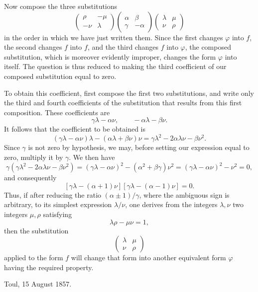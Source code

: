 \documentclass[11pt]{article}
\begin{document}
Now compose the three substitutions
\[
\begin{pmatrix}\rho&-\mu\\ -\nu&\lambda\end{pmatrix}
\begin{pmatrix}\alpha&\beta\\ \gamma&-\alpha\end{pmatrix}
\begin{pmatrix}\lambda&\mu\\ \nu&\rho\end{pmatrix}
\]
in the order in which we have just written them. Since the first changes \(\varphi\) into \(f\), the second changes \(f\) into \(f\), and the third changes \(f\) into \(\varphi\), the composed substitution, which is moreover evidently improper, changes the form \(\varphi\) into itself. The question is thus reduced to making the third coefficient of our composed substitution equal to zero.

To obtain this coefficient, first compose the first two substitutions, and write only the third and fourth coefficients of the substitution that results from this first composition. These coefficients are
\[
\gamma\lambda-\alpha\nu,\qquad -\alpha\lambda-\beta\nu.
\]
It follows that the coefficient to be obtained is
\[
(\gamma\lambda-\alpha\nu)\lambda-(\alpha\lambda+\beta\nu)\nu
=\gamma\lambda^2-2\alpha\lambda\nu-\beta\nu^2.
\]
Since \(\gamma\) is not zero by hypothesis, we may, before setting our expression equal to zero, multiply it by \(\gamma\). We then have
\[
\gamma(\gamma\lambda^2-2\alpha\lambda\nu-\beta\nu^2)
=(\gamma\lambda-\alpha\nu)^2-(\alpha^2+\beta\gamma)\nu^2
=(\gamma\lambda-\alpha\nu)^2-\nu^2=0,
\]
and consequently
\[
[\gamma\lambda-(\alpha+1)\nu][\gamma\lambda-(\alpha-1)\nu]=0.
\]
Thus, if after reducing the ratio \((\alpha\pm1)/\gamma\), where the ambiguous sign is arbitrary, to its simplest expression \(\lambda/\nu\), one derives from the integers \(\lambda,\nu\) two integers \(\mu,\rho\) satisfying
\[
\lambda\rho-\mu\nu=1,
\]
then the substitution
\[
\begin{pmatrix}\lambda&\mu\\ \nu&\rho\end{pmatrix}
\]
applied to the form \(f\) will change that form into another equivalent form \(\varphi\) having the required property.

\begin{flushright}
Toul, 15 August 1857.
\end{flushright}
\end{document}
